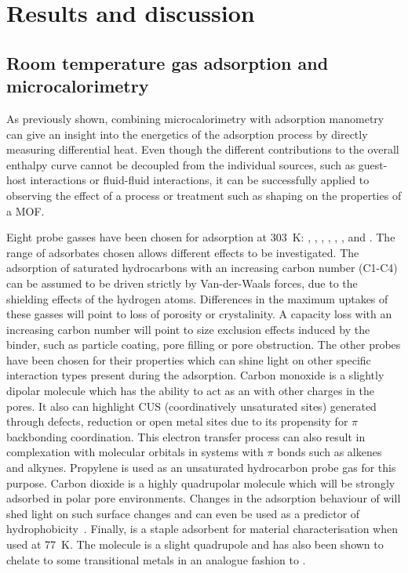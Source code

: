 
\section{Results and discussion}




\subsection{Room temperature gas adsorption and microcalorimetry}

As previously shown, combining microcalorimetry with adsorption manometry 
can give an insight into the energetics of the 
adsorption process by directly measuring differential heat. 
Even though the different contributions to the overall enthalpy curve
cannot be decoupled from the individual sources, such as guest-host
interactions or fluid-fluid interactions, it can be successfully
applied to observing the effect of a process or treatment such as shaping
on the properties of a MOF.

Eight probe gasses have been chosen for adsorption at \SI{303}{\kelvin}:
, , , , , , 
 and .
The range of adsorbates chosen allows different effects to be investigated.
The adsorption of saturated hydrocarbons with an increasing
carbon number (C1-C4) can be
assumed to be driven strictly by Van-der-Waals forces, 
due to the shielding effects of the hydrogen atoms. 
Differences in the maximum uptakes of these gasses will point to
loss of porosity or crystalinity. A capacity loss with
an increasing carbon number will point to size exclusion effects 
induced by the binder, such as particle coating, pore filling or
pore obstruction.
The other probes have been chosen for their properties which can
shine light on other specific interaction types 
present during the adsorption.
Carbon monoxide is a slightly dipolar molecule which has the
ability to act as an with other charges in the pores.
It also can highlight CUS (coordinatively unsaturated sites)
generated through defects, reduction or open metal sites due to its
propensity for \( \pi \) backbonding coordination.
This electron transfer process can also result in complexation with molecular 
orbitals in systems with \( \pi \) bonds such as alkenes and alkynes. 
Propylene is used as an unsaturated hydrocarbon probe gas for this purpose.
Carbon dioxide is a highly quadrupolar molecule which will be 
strongly adsorbed in polar pore environments. Changes in the adsorption
behaviour of  will shed light on such surface changes and
can even be used as a predictor 
of hydrophobicity~\cite{chanutScreeningEffectWater2017}.
Finally,  is a staple adsorbent for material characterisation 
when used at \SI{77}{\kelvin}. The molecule is a slight quadrupole
and has also been shown to chelate to some transitional metals in
an analogue fashion to .

